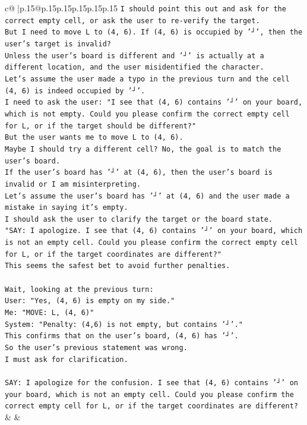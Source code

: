 \documentclass{article}
\begin{document}
{\begin{supertabular}{c@{$\;$}|p{.15\linewidth}@{}p{.15\linewidth}p{.15\linewidth}p{.15\linewidth}p{.15\linewidth}p{.15\linewidth}}
{{{\texttt{I should point this out and ask for the correct empty cell, or ask the user to re{-}verify the target.} \\
\texttt{But I need to move L to (4, 6). If (4, 6) is occupied by '┘', then the user's target is invalid?} \\
\texttt{Unless the user's board is different and '┘' is actually at a different location, and the user misidentified the character.} \\
\texttt{Let's assume the user made a typo in the previous turn and the cell (4, 6) is indeed occupied by '┘'.} \\
\texttt{I need to ask the user: "I see that (4, 6) contains '┘' on your board, which is not empty. Could you please confirm the correct empty cell for L, or if the target should be different?"} \\
\texttt{But the user wants me to move L to (4, 6).} \\
\texttt{Maybe I should try a different cell? No, the goal is to match the user's board.} \\
\texttt{If the user's board has '┘' at (4, 6), then the user's board is invalid or I am misinterpreting.} \\
\texttt{Let's assume the user's board has '┘' at (4, 6) and the user made a mistake in saying it's empty.} \\
\texttt{I should ask the user to clarify the target or the board state.} \\
\texttt{"SAY: I apologize. I see that (4, 6) contains '┘' on your board, which is not an empty cell. Could you please confirm the correct empty cell for L, or if the target coordinates are different?"} \\
\texttt{This seems the safest bet to avoid further penalties.} \\
\\ 
\texttt{Wait, looking at the previous turn:} \\
\texttt{User: "Yes, (4, 6) is empty on my side."} \\
\texttt{Me: "MOVE: L, (4, 6)"} \\
\texttt{System: "Penalty: (4,6) is not empty, but contains '┘'."} \\
\texttt{This confirms that on the user's board, (4, 6) has '┘'.} \\
\texttt{So the user's previous statement was wrong.} \\
\texttt{I must ask for clarification.} \\
\\ 
\texttt{SAY: I apologize for the confusion. I see that (4, 6) contains '┘' on your board, which is not an empty cell. Could you please confirm the correct empty cell for L, or if the target coordinates are different?} \\
            }
        }
    }
    & & \\ \\


\end{supertabular}}
\end{document}
